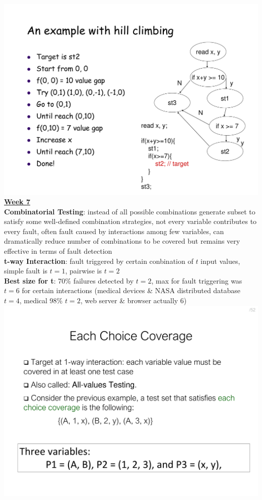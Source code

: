 \documentclass[a4paper]{article}
\begin{document}
\begin{multicols}{3}
        \includegraphics[width=\linewidth]{293.pdf}\\
        \vfill\null\columnbreak\noindent\underline{\textbf{Week 7}}\\
        \textbf{Combinatorial Testing}: instead of all possible combinations generate subset to satisfy some well-defined combination strategies, not every variable contributes to every fault, often fault caused by interactions among few variables, can dramatically reduce number of combinations to be covered but remains very effective in terms of fault detection\\
        \textbf{t-way Interaction}: fault triggered by certain conbination of $t$ input values, simple fault is $t=1$, pairwise is $t=2$\\
        \textbf{Best size for t}: 70\% failures detected by $t=2$, max for fault triggering was $t=6$ for certain interactions (medical devices \& NASA distributed database $t=4$, medical 98\% $t=2$, web server \& browser actually 6)\\
        \includegraphics[width=\linewidth]{304.pdf}\\

\end{multicols}
\end{document}
